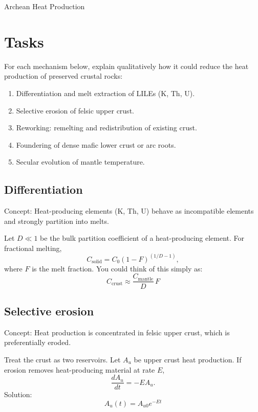 \begin{activity}{Archean Heat Production}
\section*{Tasks}
For each mechanism below, explain qualitatively how it could reduce the heat
production of preserved crustal rocks:
\begin{enumerate}
  \item Differentiation and melt extraction of LILEs (K, Th, U).
  \answerbox[2.5cm]
  \item Selective erosion of felsic upper crust.
  \answerbox[2.5cm]
  \item Reworking: remelting and redistribution of existing crust.
  \answerbox[2.5cm]
  \item Foundering of dense mafic lower crust or arc roots.
  \answerbox[2.5cm]
  \item Secular evolution of mantle temperature.
  \answerbox[2.5cm]
\end{enumerate}

\subsection*{Differentiation}
Concept: Heat-producing elements (K, Th, U) behave as incompatible elements and strongly partition into melts.

Let $D \ll 1$ be the bulk partition coefficient of a heat-producing element.
For fractional melting,
\[
C_{\text{solid}} = C_0 (1 - F)^{(1/D - 1)},
\]
where $F$ is the melt fraction.  You could think of this simply as:
\[
C_{\text{crust}} \approx \frac{C_{\text{mantle}}}{D} \, F
\]



\subsection*{Selective erosion}
Concept: Heat production is concentrated in felsic upper crust, which is preferentially eroded.

Treat the crust as two reservoirs.  Let $A_u$ be upper crust heat production.  If erosion removes heat-producing material at rate $E$,
\[
\frac{dA_u}{dt} = -E A_u.
\]
Solution:
\[
A_u(t) = A_{u0} e^{-Et}
\]


\end{activity}

